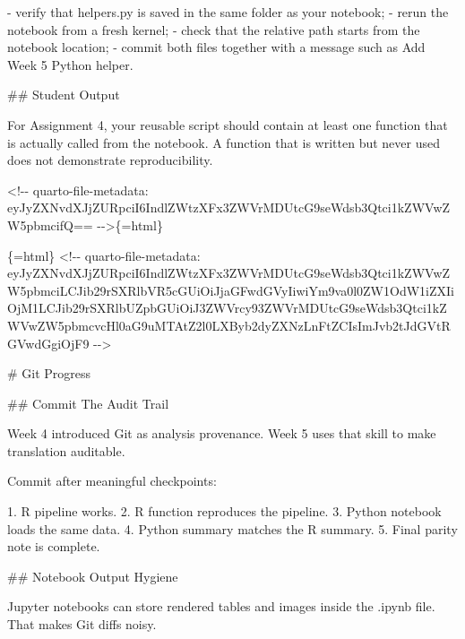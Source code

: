 \documentclass[
  letterpaper,
  DIV=11,
  numbers=noendperiod,
  oneside]{scrreprt}
\newenvironment{Shaded}{\begin{snugshade}}{\end{snugshade}}
\newcommand{\FunctionTok}[1]{\textcolor[rgb]{0.28,0.35,0.67}{#1}}
\newcommand{\InformationTok}[1]{\textcolor[rgb]{0.37,0.37,0.37}{#1}}
\newcommand{\NormalTok}[1]{\textcolor[rgb]{0.00,0.23,0.31}{#1}}
\newcommand{\SpecialStringTok}[1]{\textcolor[rgb]{0.13,0.47,0.30}{#1}}
\begin{document}
\begin{Shaded}
\begin{Highlighting}[numbers=left,,]
\SpecialStringTok{{-} }\NormalTok{verify that }\InformationTok{\textasciigrave{}helpers.py\textasciigrave{}}\NormalTok{ is saved in the same folder as your notebook;}
\SpecialStringTok{{-} }\NormalTok{rerun the notebook from a fresh kernel;}
\SpecialStringTok{{-} }\NormalTok{check that the relative path starts from the notebook location;}
\SpecialStringTok{{-} }\NormalTok{commit both files together with a message such as }\InformationTok{\textasciigrave{}Add Week 5 Python helper\textasciigrave{}}\NormalTok{.}

\FunctionTok{\#\# Student Output}

\NormalTok{For Assignment 4, your reusable script should contain at least one function that is actually called from the notebook. A function that is written but never used does not demonstrate reproducibility.}


\InformationTok{\textasciigrave{}\textless{}!{-}{-} quarto{-}file{-}metadata: eyJyZXNvdXJjZURpciI6IndlZWtzXFx3ZWVrMDUtcG9seWdsb3Qtci1kZWVwZW5pbmcifQ== {-}{-}\textgreater{}\textasciigrave{}}\NormalTok{\{=html\}}

\InformationTok{\textasciigrave{}\textasciigrave{}\textasciigrave{}\{=html\}}
\InformationTok{\textless{}!{-}{-} quarto{-}file{-}metadata: eyJyZXNvdXJjZURpciI6IndlZWtzXFx3ZWVrMDUtcG9seWdsb3Qtci1kZWVwZW5pbmciLCJib29rSXRlbVR5cGUiOiJjaGFwdGVyIiwiYm9va0l0ZW1OdW1iZXIiOjM1LCJib29rSXRlbUZpbGUiOiJ3ZWVrcy93ZWVrMDUtcG9seWdsb3Qtci1kZWVwZW5pbmcvcHl0aG9uMTAtZ2l0LXByb2dyZXNzLnFtZCIsImJvb2tJdGVtRGVwdGgiOjF9 {-}{-}\textgreater{}}
\InformationTok{\textasciigrave{}\textasciigrave{}\textasciigrave{}}

\FunctionTok{\# Git Progress }


\FunctionTok{\#\# Commit The Audit Trail}

\NormalTok{Week 4 introduced Git as analysis provenance. Week 5 uses that skill to make translation auditable.}

\NormalTok{Commit after meaningful checkpoints:}

\SpecialStringTok{1. }\NormalTok{R pipeline works.}
\SpecialStringTok{2. }\NormalTok{R function reproduces the pipeline.}
\SpecialStringTok{3. }\NormalTok{Python notebook loads the same data.}
\SpecialStringTok{4. }\NormalTok{Python summary matches the R summary.}
\SpecialStringTok{5. }\NormalTok{Final parity note is complete.}

\FunctionTok{\#\# Notebook Output Hygiene}

\NormalTok{Jupyter notebooks can store rendered tables and images inside the }\InformationTok{\textasciigrave{}.ipynb\textasciigrave{}}\NormalTok{ file. That makes Git diffs noisy.}


\end{Highlighting}
\end{Shaded}
\end{document}
